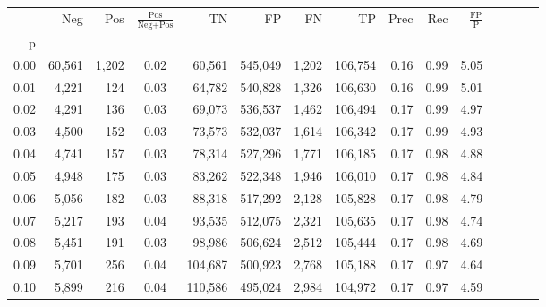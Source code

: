 \begin{tabular}{rrrcrrrrrrrrrrr}
\toprule
{} &     Neg &     Pos & $\frac{\text{Pos}}{\text{Neg}+\text{Pos}}$ &       TN &       FP &       FN &       TP &  Prec &   Rec & $\frac{\text{FP}}{\text{P}}$ \\
p    &         &         &                                            &          &          &          &          &       &       &                              \\
\midrule
0.00 &  60,561 &   1,202 &                                       0.02 &   60,561 &  545,049 &    1,202 &  106,754 &  0.16 &  0.99 &                         5.05 \\
0.01 &   4,221 &     124 &                                       0.03 &   64,782 &  540,828 &    1,326 &  106,630 &  0.16 &  0.99 &                         5.01 \\
0.02 &   4,291 &     136 &                                       0.03 &   69,073 &  536,537 &    1,462 &  106,494 &  0.17 &  0.99 &                         4.97 \\
0.03 &   4,500 &     152 &                                       0.03 &   73,573 &  532,037 &    1,614 &  106,342 &  0.17 &  0.99 &                         4.93 \\
0.04 &   4,741 &     157 &                                       0.03 &   78,314 &  527,296 &    1,771 &  106,185 &  0.17 &  0.98 &                         4.88 \\
0.05 &   4,948 &     175 &                                       0.03 &   83,262 &  522,348 &    1,946 &  106,010 &  0.17 &  0.98 &                         4.84 \\
0.06 &   5,056 &     182 &                                       0.03 &   88,318 &  517,292 &    2,128 &  105,828 &  0.17 &  0.98 &                         4.79 \\
0.07 &   5,217 &     193 &                                       0.04 &   93,535 &  512,075 &    2,321 &  105,635 &  0.17 &  0.98 &                         4.74 \\
0.08 &   5,451 &     191 &                                       0.03 &   98,986 &  506,624 &    2,512 &  105,444 &  0.17 &  0.98 &                         4.69 \\
0.09 &   5,701 &     256 &                                       0.04 &  104,687 &  500,923 &    2,768 &  105,188 &  0.17 &  0.97 &                         4.64 \\
0.10 &   5,899 &     216 &                                       0.04 &  110,586 &  495,024 &    2,984 &  104,972 &  0.17 &  0.97 &                         4.59 \\

\end{tabular}
